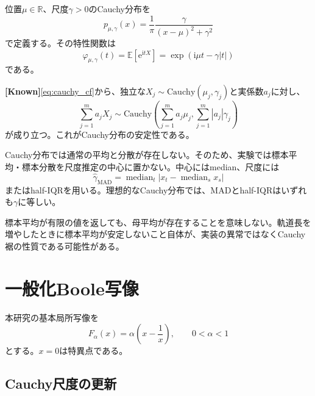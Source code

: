 \documentclass[a4paper,11pt,oneside,openany]{ltjsbook}
\newcommand{\R}{\mathbb{R}}
\newcommand{\E}{\mathbb{E}}
\newcommand{\median}{\operatorname{median}}
\newcommand{\e}{\mathrm{e}}
\newcommand{\ii}{\mathrm{i}}
\newcommand{\Known}{\textcolor{Forest}{\sffamily\bfseries [Known]}}
\begin{document}
位置\(\mu\in\R\)、尺度\(\gamma>0\)のCauchy分布を
\begin{equation}
  p_{\mu,\gamma}(x)
  = \frac{1}{\pi}\frac{\gamma}{(x-\mu)^2+\gamma^2}
  \label{eq:cauchy_density}
\end{equation}
で定義する。その特性関数は
\begin{equation}
  \varphi_{\mu,\gamma}(t)
  = \E[\e^{\ii tX}]
  = \exp\!\left(\ii\mu t-\gamma|t|\right)
  \label{eq:cauchy_cf}
\end{equation}
である。

\Known \cref{eq:cauchy_cf}から、独立な\(X_j\sim\mathrm{Cauchy}(\mu_j,\gamma_j)\)と実係数\(a_j\)に対し、
\begin{equation}
  \sum_{j=1}^{m}a_jX_j
  \sim
  \mathrm{Cauchy}\!\left(
    \sum_{j=1}^{m}a_j\mu_j,
    \sum_{j=1}^{m}|a_j|\gamma_j
  \right)
  \label{eq:cauchy_linear_stability}
\end{equation}
が成り立つ。これがCauchy分布の安定性である。

Cauchy分布では通常の平均と分散が存在しない。そのため、実験では標本平均・標本分散を尺度推定の中心に置かない。中心にはmedian、尺度には
\begin{equation}
  \widehat\gamma_{\mathrm{MAD}}
  = \median_t |x_t-\median_s x_s|
  \label{eq:cauchy_mad}
\end{equation}
またはhalf-IQRを用いる。理想的なCauchy分布では、MADとhalf-IQRはいずれも\(\gamma\)に等しい。

\begin{cautionbox}
標本平均が有限の値を返しても、母平均が存在することを意味しない。軌道長を増やしたときに標本平均が安定しないこと自体が、実装の異常ではなくCauchy裾の性質である可能性がある。
\end{cautionbox}

\section{一般化Boole写像}

本研究の基本局所写像を
\begin{equation}
  F_{\alpha}(x)
  = \alpha\left(x-\frac{1}{x}\right),
  \qquad 0<\alpha<1
  \label{eq:boole_map}
\end{equation}
とする。\(x=0\)は特異点である。

\subsection{Cauchy尺度の更新}
\end{document}

